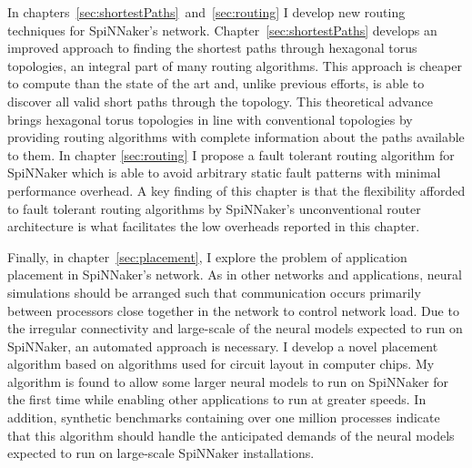 In chapters~\ref{sec:shortestPaths}~and~\ref{sec:routing} I develop new routing
techniques for SpiNNaker's network. Chapter~\ref{sec:shortestPaths} develops an
improved approach to finding the shortest paths through hexagonal torus
topologies, an integral part of many routing algorithms. This approach is
cheaper to compute than the state of the art and, unlike previous efforts, is
able to discover all valid short paths through the topology. This theoretical
advance brings hexagonal torus topologies in line with conventional topologies
by providing routing algorithms with complete information about the paths
available to them. In chapter \ref{sec:routing} I propose a fault tolerant
routing algorithm for SpiNNaker which is able to avoid arbitrary static fault
patterns with minimal performance overhead. A key finding of this chapter is
that the flexibility afforded to fault tolerant routing algorithms by
SpiNNaker's unconventional router architecture is what facilitates the low
overheads reported in this chapter.

Finally, in chapter~\ref{sec:placement}, I explore the problem of application
placement in SpiNNaker's network. As in other networks and applications, neural
simulations should be arranged such that communication occurs primarily between
processors close together in the network to control network load. Due to the
irregular connectivity and large-scale of the neural models expected to run on
SpiNNaker, an automated approach is necessary. I develop a novel placement
algorithm based on algorithms used for circuit layout in computer chips. My
algorithm is found to allow some larger neural models to run on SpiNNaker for
the first time while enabling other applications to run at greater speeds. In
addition, synthetic benchmarks containing over one million processes indicate
that this algorithm should handle the anticipated demands of the neural models
expected to run on large-scale SpiNNaker installations.
